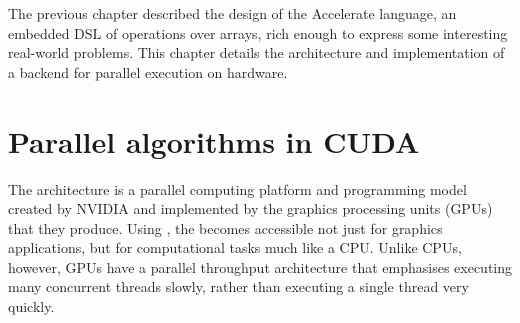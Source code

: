 

The previous chapter described the design of the Accelerate language, an
embedded DSL of operations over arrays, rich enough to express some interesting
real-world problems. This chapter details the architecture and implementation of
a backend for parallel execution on \CUDA hardware.


\section{Parallel algorithms in CUDA}

The \CUDA architecture is a parallel computing platform and programming model
created by NVIDIA and implemented by the graphics processing units
(GPUs)
that they produce. Using \CUDA, the \GPU becomes accessible not just for
graphics applications, but for computational tasks much like a CPU\@. Unlike
CPUs, however, GPUs have a parallel throughput architecture that emphasises
executing many concurrent threads slowly, rather than executing a single thread
very quickly.

